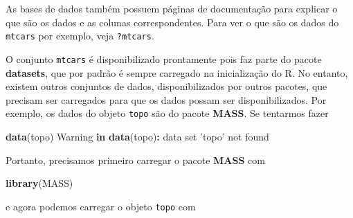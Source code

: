\documentclass[10pt,a4paper]{book}
\newenvironment{Shaded}{\begin{snugshade}}{\end{snugshade}}
\newcommand{\KeywordTok}[1]{\textcolor[rgb]{0.13,0.29,0.53}{\textbf{#1}}}
\newcommand{\DecValTok}[1]{\textcolor[rgb]{0.00,0.00,0.81}{#1}}
\newcommand{\FloatTok}[1]{\textcolor[rgb]{0.00,0.00,0.81}{#1}}
\newcommand{\StringTok}[1]{\textcolor[rgb]{0.31,0.60,0.02}{#1}}
\newcommand{\ControlFlowTok}[1]{\textcolor[rgb]{0.13,0.29,0.53}{\textbf{#1}}}
\newcommand{\OperatorTok}[1]{\textcolor[rgb]{0.81,0.36,0.00}{\textbf{#1}}}
\newcommand{\ErrorTok}[1]{\textcolor[rgb]{0.64,0.00,0.00}{\textbf{#1}}}
\newcommand{\NormalTok}[1]{#1}
\begin{document}
As bases de dados também possuem páginas de documentação para explicar o
que são os dados e as colunas correspondentes. Para ver o que são os
dados do \texttt{mtcars} por exemplo, veja \texttt{?mtcars}.

O conjunto \texttt{mtcars} é disponibilizado prontamente pois faz parte
do pacote \textbf{datasets}, que por padrão é sempre carregado na
inicialização do R. No entanto, existem outros conjuntos de dados,
disponibilizados por outros pacotes, que precisam ser carregados para
que os dados possam ser disponibilizados. Por exemplo, os dados do
objeto \texttt{topo} são do pacote \textbf{MASS}. Se tentarmos fazer

\begin{Shaded}
\begin{Highlighting}[]
\KeywordTok{data}\NormalTok{(topo)}
\NormalTok{Warning }\ControlFlowTok{in} \KeywordTok{data}\NormalTok{(topo)}\OperatorTok{:}\StringTok{ }\NormalTok{data set }\StringTok{'topo'}\NormalTok{ not found}
\end{Highlighting}
\end{Shaded}

Portanto, precisamos primeiro carregar o pacote \textbf{MASS} com

\begin{Shaded}
\begin{Highlighting}[]
\KeywordTok{library}\NormalTok{(MASS)}
\end{Highlighting}
\end{Shaded}

e agora podemos carregar o objeto \texttt{topo} com

\begin{Shaded}
\end{Shaded}
\end{document}
